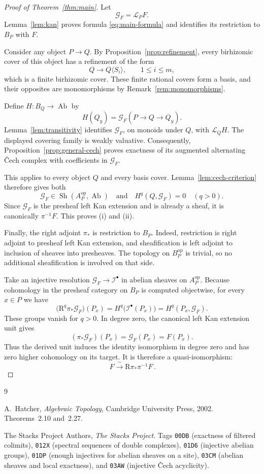 \documentclass[11pt]{article}
\theoremstyle{definition}
\theoremstyle{remark}
\DeclareMathOperator{\Sh}{Sh}
\DeclareMathOperator{\Ab}{Ab}
\newcommand{\LL}{\mathcal L}
\newcommand{\cG}{\mathcal G}
\begin{document}
\begin{proof}[Proof of Theorem~\ref{thm:main}]
Let
\[
\cG_F=\LL_PF.
\]
Lemma~\ref{lem:kan} proves formula \eqref{eq:main-formula} and
identifies its restriction to \(B_P\) with \(F\).

Consider any object \(P\to Q\). By
Proposition~\ref{prop:refinement}, every birhizomic cover of this
object has a refinement of the form
\[
Q\longrightarrow Q\langle S_i\rangle,\qquad 1\le i\le m,
\]
which is a finite birhizomic cover. These finite rational covers
form a basis, and their opposites are monomorphisms by
Remark~\ref{rem:monomorphisms}.

Define \(H:B_Q\to\Ab\) by
\[
H(Q_y)=\cG_F(P\to Q\to Q_y).
\]
Lemma~\ref{lem:transitivity} identifies \(\cG_F\), on monoids under
\(Q\), with \(\LL_QH\).
The displayed covering family is weakly valuative. Consequently,
Proposition~\ref{prop:general-cech} proves exactness of its
augmented alternating \v{C}ech complex with coefficients in
\(\cG_F\).

This applies to every object \(Q\) and every basis cover.
Lemma~\ref{lem:cech-criterion} therefore gives both
\[
\cG_F\in\Sh(A_P^{\mathrm{op}},\Ab)
\quad\text{and}\quad
H^q(Q,\cG_F)=0\quad(q>0).
\]
Since \(\cG_F\) is the presheaf left Kan extension and is already
a sheaf, it is canonically \(\pi^{-1}F\). This proves (i) and (ii).

Finally, the right adjoint \(\pi_*\) is restriction to \(B_P\).
Indeed, restriction is right adjoint to presheaf left Kan
extension, and sheafification is left adjoint to inclusion of
sheaves into presheaves. The topology on \(B_P^{\mathrm{op}}\)
is trivial, so no additional sheafification is involved on that
side.

Take an injective resolution \(\cG_F\to\mathcal I^\bullet\) in
abelian sheaves on \(A_P^{\mathrm{op}}\).
Because cohomology in the presheaf category on \(B_P\) is
computed objectwise, for every \(x\in P\) we have
\[
\bigl(\mathrm R^q\pi_*\cG_F\bigr)(P_x)
=
H^q\bigl(\mathcal I^\bullet(P_x)\bigr)
=
H^q(P_x,\cG_F).
\]
These groups vanish for \(q>0\). In degree zero, the canonical
left Kan extension unit gives
\[
(\pi_*\cG_F)(P_x)=\cG_F(P_x)=F(P_x).
\]
Thus the derived unit induces the identity isomorphism in degree
zero and has zero higher cohomology on its target. It is
therefore a quasi-isomorphism:
\[
\boxed{\,F\xrightarrow{\ \sim\ }\mathrm R\pi_*\pi^{-1}F\,}.
\]
\end{proof}

\begin{thebibliography}{9}

A.~Hatcher,
\emph{Algebraic Topology},
Cambridge University Press, 2002.
Theorems~2.10 and~2.27.

The Stacks Project Authors,
\emph{The Stacks Project}.
Tags \texttt{00DB} (exactness of filtered colimits),
\texttt{012X} (spectral sequences of double complexes),
\texttt{01D6} (injective abelian groups),
\texttt{01DP} (enough injectives for abelian sheaves on a site),
\texttt{03CM} (abelian sheaves and local exactness), and
\texttt{03AW} (injective \v{C}ech acyclicity).

\end{thebibliography}
\end{document}
